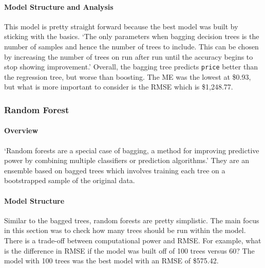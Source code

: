 \documentclass[
  paper=a4,
  ,captions=tableheading
]{scrartcl}
\begin{document}
\hypertarget{model-structure-and-analysis-2}{%
\paragraph{Model Structure and
Analysis}\label{model-structure-and-analysis-2}}

This model is pretty straight forward because the best model was built
by sticking with the basics. `The only parameters when bagging decision
trees is the number of samples and hence the number of trees to include.
This can be chosen by increasing the number of trees on run after run
until the accuracy begins to stop showing improvement.' Overall, the
bagging tree predicts \texttt{price} better than the regression tree,
but worse than boosting. The ME was the lowest at \$0.93, but what is
more important to consider is the RMSE which is \$1,248.77.

\hypertarget{random-forest}{%
\subsubsection{Random Forest}\label{random-forest}}

\hypertarget{overview-3}{%
\paragraph{Overview}\label{overview-3}}

`Random forests are a special case of bagging, a method for improving
predictive power by combining multiple classifiers or prediction
algorithms.' They are an ensemble based on bagged trees which involves
training each tree on a bootstrapped sample of the original data.

\hypertarget{model-structure-1}{%
\paragraph{Model Structure}\label{model-structure-1}}

Similar to the bagged trees, random forests are pretty simplistic. The
main focus in this section was to check how many trees should be run
within the model. There is a trade-off between computational power and
RMSE. For example, what is the difference in RMSE if the model was built
off of 100 trees versus 60? The model with 100 trees was the best model
with an RMSE of \$575.42.
\end{document}
